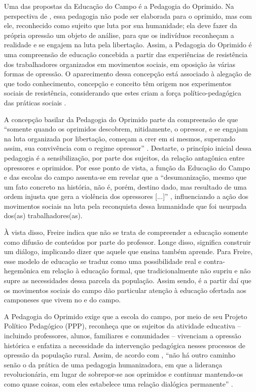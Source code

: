 \documentclass[
  12pt,
  openright,
  twoside,
  a4paper,
  english,
  brazilian,
  sumario=tradicional
]{abntex2}
\begin{document}
Uma das propostas da Educação do Campo é a Pedagogia do Oprimido. Na perspectiva de , essa pedagogia não pode ser elaborada para o oprimido, mas com ele, reconhecido como sujeito que luta por sua humanidade; ela deve fazer da própria opressão um objeto de análise, para que os indivíduos reconheçam a realidade e se engajem na luta pela libertação. Assim, a Pedagogia do Oprimido é uma compreensão de educação concebida a partir das experiências de resistência dos trabalhadores organizados em movimentos sociais, em oposição às várias formas de opressão. O aparecimento dessa concepção está associado à alegação de que todo conhecimento, concepção e conceito têm origem nos experimentos sociais de resistência, considerando que estes criam a força político-pedagógica das práticas sociais \cite{arroyo2012}.

A concepção basilar da Pedagogia do Oprimido parte da compreensão de que ``somente quando os oprimidos descobrem, nitidamente, o opressor, e se engajam na luta organizada por libertação, começam a crer em si mesmos, superando assim, sua convivência com o regime opressor'' \cite[p.~52]{freire1987}. Destarte, o princípio inicial dessa pedagogia é a sensibilização, por parte dos sujeitos, da relação antagônica entre opressores e oprimidos. Por esse ponto de vista, a função da Educação do Campo e das escolas do campo assenta-se em revelar que a ``desumanização, mesmo que um fato concreto na história, não é, porém, destino dado, mas resultado de uma ordem injusta que gera a violência dos opressores [...]'' \cite[p.~30]{freire1987}, influenciando a ação dos movimentos sociais na luta pela reconquista dessa humanidade que foi usurpada dos(as) trabalhadores(as).

À vista disso, Freire indica que não se trata de compreender a educação somente como difusão de conteúdos por parte do professor. Longe disso, significa construir um diálogo, implicando dizer que aquele que ensina também aprende. Para Freire, esse modelo de educação se traduz como uma possibilidade real e contra-hegemônica em relação à educação formal, que tradicionalmente não supriu e não supre as necessidades dessa parcela da população. Assim sendo, é a partir daí que os movimentos sociais do campo dão particular atenção à educação ofertada aos camponeses que vivem no e do campo.

A Pedagogia do Oprimido exige que a escola do campo, por meio de seu Projeto Político Pedagógico (PPP), reconheça que os sujeitos da atividade educativa -- incluindo professores, alunos, familiares e comunidades -- vivenciam a opressão histórica e enfatiza a necessidade da intervenção pedagógica nesses processos de opressão da população rural. Assim, de acordo com , ``não há outro caminho senão o da prática de uma pedagogia humanizadora, em que a liderança revolucionária, em lugar de sobrepor-se aos oprimidos e continuar mantendo-os como quase coisas, com eles estabelece uma relação dialógica permanente'' \cite[p.~55-56]{freire1987}.
\end{document}
